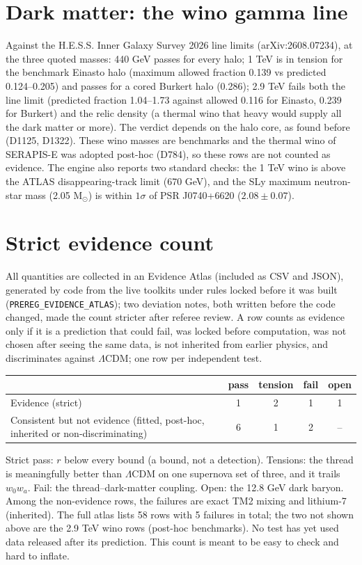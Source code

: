 \documentclass[11pt]{article}
\begin{document}
\section{Dark matter: the wino gamma line}
Against the H.E.S.S. Inner Galaxy Survey 2026 line limits (arXiv:2608.07234), at the three quoted masses: 440 GeV passes for every halo; 1 TeV is in tension for the benchmark Einasto halo (maximum allowed fraction 0.139 vs predicted 0.124--0.205) and passes for a cored Burkert halo (0.286); 2.9 TeV fails both the line limit (predicted fraction 1.04--1.73 against allowed 0.116 for Einasto, 0.239 for Burkert) and the relic density (a thermal wino that heavy would supply all the dark matter or more). The verdict depends on the halo core, as found before (D1125, D1322). These wino masses are benchmarks and the thermal wino of SERAPIS-E was adopted post-hoc (D784), so these rows are not counted as evidence. The engine also reports two standard checks: the 1 TeV wino is above the ATLAS disappearing-track limit (670 GeV), and the SLy maximum neutron-star mass (2.05 M$_\odot$) is within $1\sigma$ of PSR J0740+6620 ($2.08\pm0.07$).

\section{Strict evidence count}
All quantities are collected in an Evidence Atlas (included as CSV and JSON), generated by code from the live toolkits under rules locked before it was built (\texttt{PREREG\_EVIDENCE\_ATLAS}); two deviation notes, both written before the code changed, made the count stricter after referee review. A row counts as evidence only if it is a prediction that could fail, was locked before computation, was not chosen after seeing the same data, is not inherited from earlier physics, and discriminates against $\Lambda$CDM; one row per independent test.
\begin{center}\small
\begin{tabular}{lcccc}\toprule
 & pass & tension & fail & open\\\midrule
Evidence (strict) & 1 & 2 & 1 & 1\\
Consistent but not evidence (fitted, post-hoc, inherited or non-discriminating) & 6 & 1 & 2 & --\\\bottomrule
\end{tabular}
\end{center}
Strict pass: $r$ below every bound (a bound, not a detection). Tensions: the thread is meaningfully better than $\Lambda$CDM on one supernova set of three, and it trails $w_0w_a$. Fail: the thread--dark-matter coupling. Open: the 12.8 GeV dark baryon. Among the non-evidence rows, the failures are exact TM2 mixing and lithium-7 (inherited). The full atlas lists 58 rows with 5 failures in total; the two not shown above are the 2.9 TeV wino rows (post-hoc benchmarks). No test has yet used data released after its prediction. This count is meant to be easy to check and hard to inflate.
\end{document}
